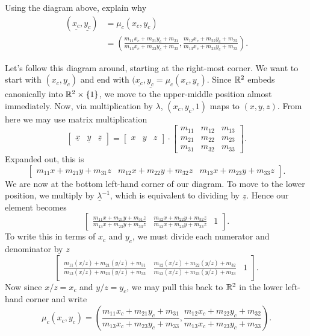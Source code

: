 \documentclass{ximera}
\begin{document}
\begin{problem}
  Using the diagram above, explain why
  \begin{align*}
(\underline{x_{c}},\underline{y_{c}})  &= \mu_{c}(x_{c},y_{c}) \\
  & =\left(\frac{m_{11}x_{c}+m_{21}y_{c}+m_{31}}{m_{13}x_{c}+m_{23}y_{c}+m_{33}},
  \frac{m_{12}x_{c}+m_{22}y_{c}+m_{32}}{m_{13}x_{c}+m_{23}y_{c}+m_{33}
}\right).
  \end{align*}
  \begin{freeResponse}
    Let's follow this diagram around, starting at the right-most
    corner. We want to start with $(x_c,y_c)$ and end with
    $(\underline{x_c},\underline{y_c} = \mu_c(x_c,y_c)$. Since $\mathbb R^2$
    embeds canonically into $\mathbb R^2\times\{1\}$, we move to the
    upper-middle position almost immediately. Now, via multiplication
    by $\lambda$, $(x_c,y_c,1)$ maps to $(x,y,z)$. From here we may use
    matrix multiplication
    \[
    \begin{bmatrix}
      \underline{x} & \underline{y} & \underline{z}
    \end{bmatrix}
    =
    \begin{bmatrix}
    x & y & z
    \end{bmatrix}
    \cdot\begin{bmatrix}
    m_{11} & m_{12} & m_{13}\\
    m_{21} & m_{22} & m_{23}\\
    m_{31} & m_{32} & m_{33}
    \end{bmatrix}.
    \]
    Expanded out, this is
    \[
    \begin{bmatrix}
      m_{11}x+m_{21}y+m_{31}z & m_{12}x+m_{22}y+m_{32}z & 
      m_{13}x+m_{23}y+m_{33}z
    \end{bmatrix}.
    \]
    We are now at the bottom left-hand corner of our diagram. To move
    to the lower position, we multiply by $\underline{\lambda}^{-1}$, which
    is equivalent to dividing by $\underline{z}$. Hence our element
    becomes
     \[
    \begin{bmatrix}
      \frac{m_{11}x+m_{21}y+m_{31}z}{m_{13}x+m_{23}y+m_{33}z} &
      \frac{m_{12}x+m_{22}y+m_{32}z}{m_{13}x+m_{23}y+m_{33}z} & 1
    \end{bmatrix}.
    \]
    To write this in terms of $x_c$ and $y_c$, we must divide each
    numerator and denominator by $z$
    \[
    \begin{bmatrix}
      \frac{m_{11}(x/z)+m_{21}(y/z)+m_{31}}{m_{13}(x/z)+m_{23}(y/z)+m_{33}}
      &
      \frac{m_{12}(x/z)+m_{22}(y/z)+m_{32}}{m_{13}(x/z)+m_{23}(y/z)+m_{33}}
      & 1
    \end{bmatrix}.
    \]
    Now since $x/z = x_c$ and $y/z =y_c$, we may pull this back to
    $\mathbb R^2$ in the lower left-hand corner and write
    \[
    \mu_c(x_c,y_c) = \left(
    \frac{m_{11}x_c+m_{21}y_c+m_{31}}{m_{13}x_c+m_{23}y_c+m_{33}},
    \frac{m_{12}x_c+m_{22}y_c+m_{32}}{m_{13}x_c+m_{23}y_c+m_{33}}
    \right).
    \]
  \end{freeResponse}
\end{problem}
\end{document}

